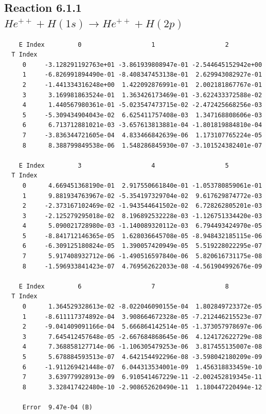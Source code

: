 \documentclass[12pt,dvipdfmx]{article}
\begin{document}
\newpage
\subsection{
Reaction 6.1.1 $   He^{++} + H(1s) \rightarrow He^{++} + H(2p)$}


\begin{small}\begin{verbatim}
    E Index         0                   1                   2
  T Index
     0     -3.128291192763e+01 -3.861939808947e-01 -2.544645152942e+00
     1     -6.826991894490e-01 -8.408347453138e-01  2.629943082927e-01
     2     -1.441334316248e+00  1.422092876991e-01  2.002181867767e-01
     3      3.169981863524e-01  1.363426173469e-01 -3.622433372588e-02
     4      1.440567980361e-01 -5.023547473715e-02 -2.472425668256e-03
     5     -5.309434904043e-02  6.625411757408e-03  1.347168808606e-03
     6      6.713712881021e-03 -3.657613813881e-04 -1.801819884810e-04
     7     -3.836344721605e-04  4.833466842639e-06  1.173107765224e-05
     8      8.388799849538e-06  1.548286845930e-07 -3.101524382401e-07

    E Index         3                   4                   5
  T Index
     0      4.669451368190e-01  2.917550661840e-01 -1.053780859061e-01
     1      9.881934763967e-02 -5.354197329704e-02  9.617629874772e-03
     2     -2.373167102469e-02 -1.943544641502e-02  6.728262805201e-03
     3     -2.125279295018e-02  8.196892532228e-03 -1.126751334420e-03
     4      5.090021728980e-03 -1.140089320112e-03  6.794493424970e-05
     5     -8.841712146365e-05  1.628036645708e-05 -8.948432185115e-06
     6     -6.309125180824e-05  1.390057420949e-05  5.519228022295e-07
     7      5.917408932712e-06 -1.490516597840e-06  5.820616731175e-08
     8     -1.596933841423e-07  4.769562622033e-08 -4.561904992676e-09

    E Index         6                   7                   8
  T Index
     0      1.364529328613e-02 -8.022046090155e-04  1.802849723372e-05
     1     -8.611117374892e-04  3.908664672328e-05 -7.212446215523e-07
     2     -9.041409091166e-04  5.666864142514e-05 -1.373057978697e-06
     3      7.645412457648e-05 -2.667684868645e-06  4.124172622729e-08
     4      7.368858127714e-06 -1.106305479253e-06  3.817455135007e-08
     5      5.678884593513e-07  4.642154492296e-08 -3.598042180209e-09
     6     -1.911269421448e-07  6.044313534001e-09  1.456318833459e-10
     7      3.639779928913e-09  6.910541467229e-11 -2.002452819345e-11
     8      3.328417422480e-10 -2.908652620490e-11  1.180447220494e-12

     Error  9.47e-04 (B)
\end{verbatim}\end{small}
\end{document}
